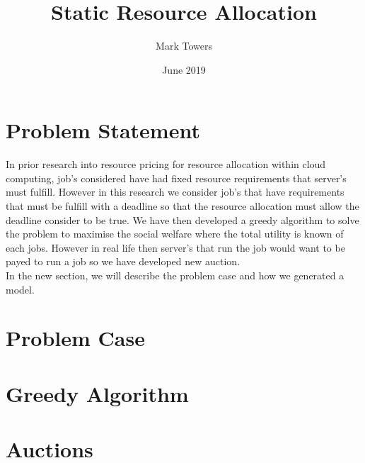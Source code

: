 \documentclass[fleqn]{article}
\title{Static Resource Allocation}
\author{Mark Towers}
\date{June 2019}
\begin{document}
\maketitle

\section{Problem Statement}\label{sec:problem-statement}
In prior research into resource pricing for resource allocation within cloud computing, job's considered have had fixed resource requirements that server's must fulfill.
However in this research we consider job's that have requirements that must be fulfill with a deadline so that the resource allocation must allow the deadline consider to be true.
We have then developed a greedy algorithm to solve the problem to maximise the social welfare where the total utility is known of each jobs.
However in real life then server's that run the job would want to be payed to run a job so we have developed new auction. \\
In the new section, we will describe the problem case and how we generated a model. \\

\section{Problem Case}\label{sec:problem-case}


\section{Greedy Algorithm}\label{sec:greedy-algorithm}


\section{Auctions}\label{sec:auction-idea}

\end{document}
